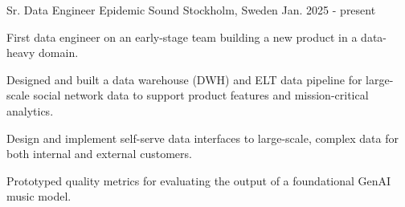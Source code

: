 

\begin{cventries}


  \cventry
    {Sr. Data Engineer} %
    {Epidemic Sound} %
    {Stockholm, Sweden} %
    {Jan. 2025 - present} %
    {
    First data engineer on an early-stage team building a new product in a data-heavy domain.
    \vspace{5.0mm}
      \begin{cvitems} %
        \item {Designed and built a data warehouse (DWH) and ELT data pipeline for large-scale social network data to support product features and mission-critical analytics.}
        \item {Design and implement self-serve data interfaces to large-scale, complex data for both internal and external customers.}
        \item {Prototyped quality metrics for evaluating the output of a foundational GenAI music model.}
      \end{cvitems}
    }


\end{cventries}
